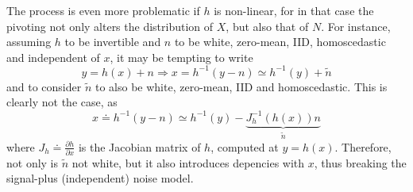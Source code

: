 \documentclass[]{article}
\begin{document}
The process is even more problematic if $h$ is non-linear, for in that case the pivoting not only alters the distribution of $X$, but also that of $N$. For instance, assuming $h$ to be invertible and $n$ to be white, zero-mean, IID, homoscedastic and independent of $x$, it may be tempting to write
\begin{equation}
y = h(x) + n \Longrightarrow x = h^{-1}(y-n) \simeq h^{-1}(y) + \tilde n
\end{equation}
and to consider $\tilde n$  to also be white, zero-mean, IID and homoscedastic. This is clearly not the case, as 
\begin{equation}
x \doteq h^{-1}(y-n) \simeq h^{-1}(y) - \underbrace{J^{-1}_h(h(x))n}_{\tilde n}
\end{equation}
where $J_h \doteq\frac{\partial h}{\partial x}$ is the Jacobian matrix of $h$, computed at $y = h(x)$. Therefore, not only is $\tilde n$ not white, but it also introduces depencies with $x$, thus breaking the signal-plus (independent) noise model.
\end{document}
